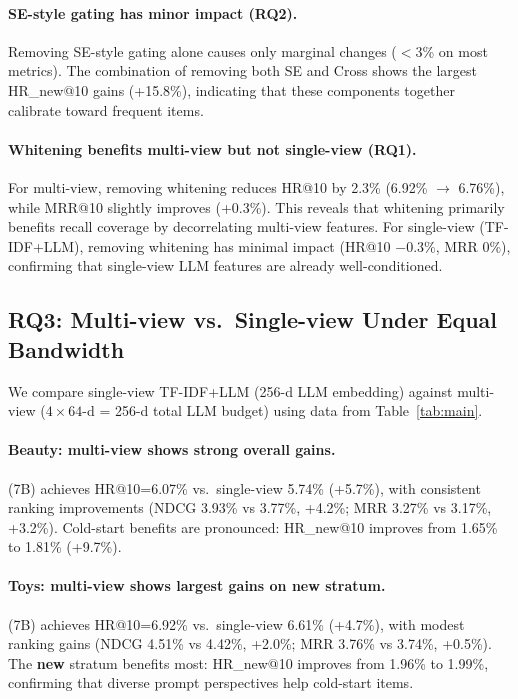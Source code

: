 \paragraph{SE-style gating has minor impact (RQ2).}
Removing SE-style gating alone causes only marginal changes ($<$3\% on
most metrics). The combination of removing both SE and Cross
shows the largest HR\_new@10 gains (+15.8\%), indicating that these
components together calibrate toward frequent items.

\paragraph{Whitening benefits multi-view but not single-view (RQ1).}
For multi-view, removing whitening reduces HR@10 by 2.3\% (6.92\% $\to$ 6.76\%),
while MRR@10 slightly improves (+0.3\%). This reveals that whitening primarily
benefits recall coverage by decorrelating multi-view features.
For single-view (TF-IDF+LLM), removing whitening has minimal impact
(HR@10 $-$0.3\%, MRR 0\%), confirming that single-view LLM features
are already well-conditioned.

\subsection{RQ3: Multi-view vs.\ Single-view Under Equal Bandwidth}

We compare single-view TF-IDF+LLM (256-d LLM embedding) against
multi-view \model ($4\times 64$-d = 256-d total LLM budget) using
data from Table~\ref{tab:main}.

\paragraph{Beauty: multi-view shows strong overall gains.}
\model (7B) achieves HR@10=6.07\% vs.\ single-view 5.74\% (+5.7\%),
with consistent ranking improvements (NDCG 3.93\% vs 3.77\%, +4.2\%;
MRR 3.27\% vs 3.17\%, +3.2\%). Cold-start benefits are pronounced:
HR\_new@10 improves from 1.65\% to 1.81\% (+9.7\%).

\paragraph{Toys: multi-view shows largest gains on new stratum.}
\model (7B) achieves HR@10=6.92\% vs.\ single-view 6.61\% (+4.7\%),
with modest ranking gains (NDCG 4.51\% vs 4.42\%, +2.0\%;
MRR 3.76\% vs 3.74\%, +0.5\%). The \textbf{new} stratum benefits
most: HR\_new@10 improves from 1.96\% to 1.99\%, confirming that
diverse prompt perspectives help cold-start items.

